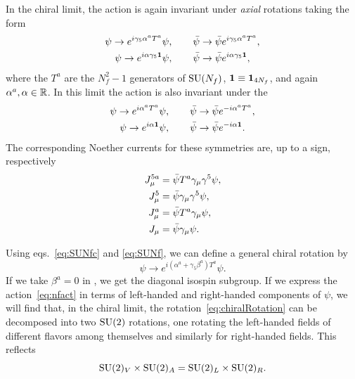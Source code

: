 In the chiral limit, the action  is again invariant under
{\it axial} rotations taking the form
\begin{gather}
  \label{eq:SUNfc}
  \psi\to e^{i\gamma_5\alpha^a T^a}\psi,\qquad
    \bar{\psi}\to\bar{\psi}e^{i\gamma_5\alpha^a T^a}, \\
  \label{eq:U1A}
  \psi\to e^{i\alpha\gamma_5 {\mathbf 1}}\psi,\qquad
    \bar{\psi}\to\bar{\psi}e^{i\alpha\gamma_5 {\mathbf 1}},
\end{gather}
where the $T^a$ are the $N_f^2-1$ generators of $\operatorname{SU}(N_f)$,
${\mathbf 1}\equiv{\mathbf 1}_{4N_f}$, and again $\alpha^a,\alpha\in\mathbb{R}$.
In this limit the action is also invariant under 
the 
\begin{gather}
  \label{eq:SUNf}
  \psi\to e^{i\alpha^a T^a}\psi,\qquad
    \bar{\psi}\to\bar{\psi}e^{-i\alpha^a T^a}, \\
  \label{eq:U1V}
  \psi\to e^{i\alpha {\mathbf 1}}\psi,\qquad
    \bar{\psi}\to\bar{\psi}e^{-i\alpha {\mathbf 1}}.
\end{gather}
The corresponding Noether currents for these symmetries are, up to a sign,
respectively
\begin{equation}\begin{aligned}
J^{5a}_\mu&=\bar{\psi} T^a\gamma_\mu\gamma^5\psi,\\
J^5_\mu&=\bar{\psi}\gamma_\mu\gamma^5\psi,\\
J^a_\mu&=\bar{\psi} T^a\gamma_\mu\psi,\\
J_\mu&=\bar{\psi}\gamma_\mu\psi.\\
\end{aligned}\end{equation}

Using eqs.~\eqref{eq:SUNfc} and \eqref{eq:SUNf}, we can define a general
chiral rotation by
\begin{equation}\label{eq:chiralRotation}
  \psi\to e^{i(\alpha^a + \gamma_5\beta^a)T^a}\psi.
\end{equation}
If we take $\beta^a=0$ in , we get the diagonal
isospin subgroup.
If we express the action~\eqref{eq:nfact} in terms of left-handed and
right-handed components of $\psi$, we will find that, in the chiral limit, the 
rotation~\eqref{eq:chiralRotation} can be decomposed into two $\operatorname{SU}(2)$
rotations, one rotating the left-handed fields of different flavors
among themselves and similarly for right-handed fields. This reflects
\begin{equation}
\operatorname{SU}(2)_V\times\operatorname{SU}(2)_A = \operatorname{SU}(2)_L\times\operatorname{SU}(2)_R.
\end{equation}

